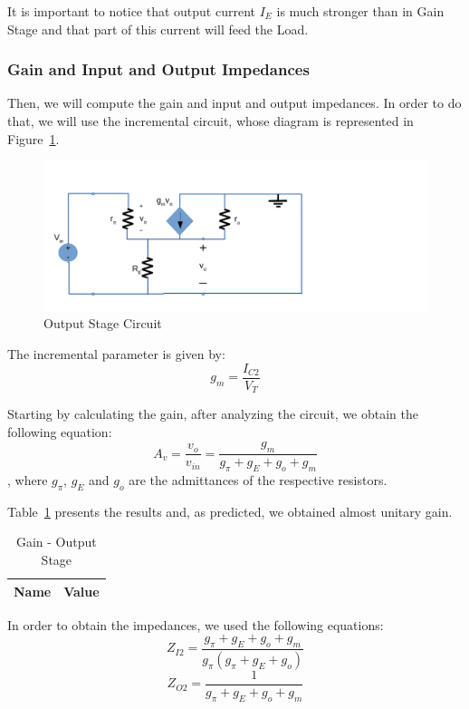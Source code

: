 It is important to notice that output current $I_E$ is much stronger than in Gain Stage and that part of this current will feed the Load.

\subsubsection{Gain and Input and Output Impedances}
Then, we will compute the gain and input and output impedances. In order to do that, we will  use the incremental circuit, whose diagram is represented in Figure~\ref{fig:osincrem}.

\begin{figure}[H] \centering
\includegraphics[width=0.8\linewidth]{incrementalos.pdf}
\caption{Output Stage Circuit}                                     %
\label{fig:osincrem}
\end{figure}

The incremental parameter is given by:
\begin{equation}
	g_m=\frac{I_{C2}}{V_{T}}
\end{equation}

Starting by calculating the gain, after analyzing the circuit, we obtain the following equation: 
\begin{equation}
	A_v=\frac{v_o}{v_{in}}=\frac{g_m}{g_\pi+g_E+g_o+g_m}
\end{equation}
, where $g_\pi$, $g_E$ and $g_o$ are the admittances of the respective resistors.

Table~\ref{tab:osav} presents the results and, as predicted, we obtained almost unitary gain.

\begin{table}[H]
  \centering
  \begin{tabular}{|l|r|}
     \hline    
    {\bf Name} & {\bf Value} \\ \hline   
    
  \end{tabular}
  \caption{Gain - Output Stage}
  \label{tab:osav}
\end{table}

In order to obtain the impedances, we used the following equations:
\begin{equation}
	Z_{I2}=\frac{g_\pi+g_E+g_o+g_m}{g_\pi(g_\pi+g_E+g_o)}
\end{equation}
\begin{equation}
	Z_{O2}=\frac{1}{g_\pi+g_E+g_o+g_m}
\end{equation}

